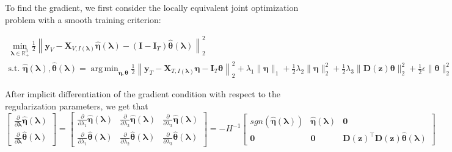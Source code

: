 \documentclass[12pt,letterpaper]{article}
\DeclareMathOperator*{\argmin}{arg\,min}
\begin{document}
To find the gradient, we first consider the locally equivalent joint optimization problem with a smooth training criterion:

\begin{equation}
\begin{array}{c}
\min_{\boldsymbol\lambda \in \mathbb{R}^3_{+}} \frac{1}{2}
\left \|
\boldsymbol{y}_V
- \boldsymbol{X}_{V, I(\boldsymbol \lambda)}\hat{\boldsymbol{\eta}}(\boldsymbol{\lambda})
- (\boldsymbol{I} - \boldsymbol{I}_T) \hat{\boldsymbol{\theta}}(\boldsymbol{\lambda})
\right \|^2_2 \\
\text{s.t. }
\hat{\boldsymbol{\eta}}(\boldsymbol{\lambda}),
\hat{\boldsymbol{\theta}}(\boldsymbol{\lambda}) =
\argmin_{\boldsymbol{\eta}, \boldsymbol{\theta}}
\frac{1}{2} \left \|
\boldsymbol{y}_T
- \boldsymbol{X}_{T, I(\boldsymbol \lambda)} \boldsymbol{\eta}
- \boldsymbol{I}_T \boldsymbol{\theta} \right \|^2_2
+ \lambda_1 \| \boldsymbol \eta \|_1
+ \frac{1}{2} \lambda_2 \| \boldsymbol \eta \|_2^2
+ \frac{1}{2} \lambda_3 \| \boldsymbol D(\boldsymbol z) \boldsymbol \theta \|_2^2
+ \frac{1}{2} \epsilon \| \boldsymbol{\theta} \|_2^2
\end{array}
\end{equation}


After implicit differentiation of the gradient condition with respect to the regularization parameters, we get that 
\begin{equation}
\begin{bmatrix}
\frac{\partial}{\partial \boldsymbol{\lambda}}\hat{\boldsymbol\eta}(\boldsymbol{\lambda})\\
\frac{\partial}{\partial \boldsymbol{\lambda}}\hat{\boldsymbol\theta}(\boldsymbol{\lambda})
\end{bmatrix}
=
\begin{bmatrix}
\frac{\partial}{\partial \lambda_1}\hat{\boldsymbol\eta}(\boldsymbol{\lambda}) & 
\frac{\partial}{\partial \lambda_3}\hat{\boldsymbol\eta}(\boldsymbol{\lambda}) & 
\frac{\partial}{\partial \lambda_3}\hat{\boldsymbol\eta}(\boldsymbol{\lambda})\\
\frac{\partial}{\partial \lambda_1}\hat{\boldsymbol\theta}(\boldsymbol{\lambda}) &
\frac{\partial}{\partial \lambda_2}\hat{\boldsymbol\theta}(\boldsymbol{\lambda}) &
\frac{\partial}{\partial \lambda_3}\hat{\boldsymbol\theta}(\boldsymbol{\lambda})
\end{bmatrix}
=
- H^{-1}
\begin{bmatrix}
sgn(\hat{\boldsymbol \eta}(\boldsymbol \lambda)) & \hat{\boldsymbol \eta}(\boldsymbol \lambda) & \boldsymbol 0\\
\boldsymbol 0 & \boldsymbol 0 & \boldsymbol D(\boldsymbol z)^\top \boldsymbol D(\boldsymbol z) \hat{\boldsymbol \theta}(\boldsymbol \lambda)
\end{bmatrix}
\end{equation}
\end{document}

